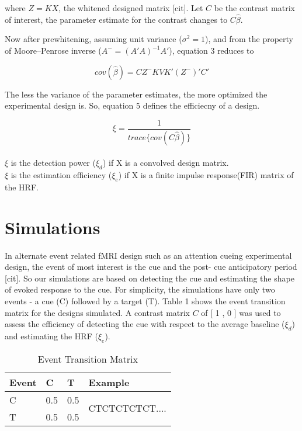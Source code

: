 \documentclass[11pt]{article}
\begin{document}
where \(Z = KX\), the whitened designed matrix [cit]. Let $C$ be the contrast matrix of interest, the parameter estimate for the contrast changes to \(C\hat{\beta}\).\par

Now after prewhitening, assuming unit variance (\(\sigma^2 = 1\)), and from the property of Moore–Penrose inverse (\(A^-=(A'A)^{-1}A'\)), equation 3 reduces to

\begin{equation}
    cov(\hat{\beta}) = CZ^-KVK'(Z^-)'C'
\end{equation}

The less the variance of the parameter estimates, the more optimized the experimental design is. So, equation 5 defines the efficiecny of a design.

\begin{equation}
    \xi = \frac{1} {trace\{cov(C\hat{\beta})\}}
\end{equation}
\\
\(\xi\) is the detection power (\(\xi_d\)) if X is a convolved design matrix.\\
\(\xi\) is the estimation efficiency (\(\xi_e\)) if X is a finite impulse response(FIR) matrix of the HRF.


\section{Simulations}
In alternate event related fMRI design such as an attention cueing experimental design, the event of most interest is the cue and the post- cue anticipatory period [cit]. So our simulations are based on detecting the cue and estimating the shape of evoked response to the cue. For simplicity, the simulations have only two events - a cue (C) followed by a target (T). Table 1 shows the event transition matrix for the designs simulated. A contrast matrix $C$ of [ 1 , 0 ] was used to assess the efficiency of detecting the cue with respect to the average baseline (\(\xi_d\)) and estimating the HRF (\(\xi_e\)).



\begin{table}[t]
\centering
\caption{Event Transition Matrix}
\begin{tabular}{llll} 
\hline
Event & C   & T   & Example                          \\ 
\hline
C     & 0.5 & 0.5 & \multirow{2}{*}{CTCTCTCTCT....}  \\
T     & 0.5 & 0.5 &                                  \\
\hline
\end{tabular}
\end{table}
\end{document}
